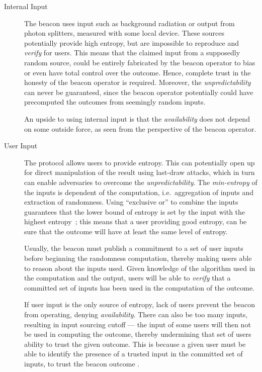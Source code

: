 \begin{description}
    
    \item[Internal Input]
        The beacon uses input such as background radiation or output from photon splitters, measured with some local device.
        These sources potentially provide high entropy\cite{nistbeacon}, but are impossible to reproduce and \emph{verify} for users.
        This means that the claimed input from a supposedly random source, could be entirely fabricated by the beacon operator to bias or even have total control over the outcome.
        Hence, complete trust in the honesty of the beacon operator is required.
        Moreover, the \emph{unpredictability} can never be guaranteed, since the beacon operator potentially could have precomputed the outcomes from seemingly random inputs.

        An upside to using internal input is that the \emph{availability} does not depend on some outside force, as seen from the perspective of the beacon operator.
    \item[User Input]
        The protocol allows users to provide entropy.
        This can potentially open up for direct manipulation of the result using last-draw attacks, which in turn can enable adversaries to overcome the \emph{unpredictability}.
        The \emph{min-entropy} of the inputs is dependent of the computation, i.e.\ aggregation of inputs and extraction of randomness.
        Using \enquote{exclusive or} to combine the inputs guarantees that the lower bound of entropy is set by the input with the highest entropy~\cite{lenstra2015random};
        this means that a user providing good entropy, can be sure that the outcome will have at least the same level of entropy.

        Usually, the beacon must publish a commitment to a set of user inputs before beginning the randomness computation,  thereby making users able to reason about the inputs used.
        Given knowledge of the algorithm used in the computation and the output, users will be able to \emph{verify} that a committed set of inputs has been used in the computation of the outcome.

        If user input is the only source of entropy, lack of users prevent the beacon from operating, denying \emph{availability}.
        There can also be too many inputs, resulting in input sourcing cutoff ---
        the input of some users will then not be used in computing the outcome, thereby undermining that set of users ability to trust the given outcome.
        This is because a given user must be able to identify the presence of a trusted input in the committed set of inputs, to trust the beacon outcome .


\end{description}
